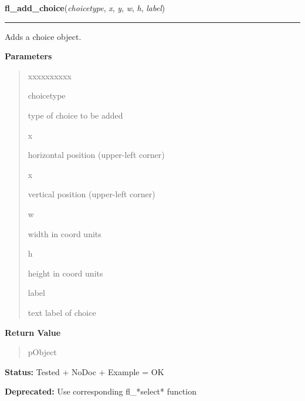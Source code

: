     \label{xformslib:deprecated:fl_add_choice}

    \vspace{0.5ex}

\hspace{.8\funcindent}\begin{boxedminipage}{\funcwidth}

    \raggedright \textbf{fl\_add\_choice}(\textit{choicetype}, \textit{x}, \textit{y}, \textit{w}, \textit{h}, \textit{label})

    \vspace{-1.5ex}

    \rule{\textwidth}{0.5\fboxrule}
\setlength{\parskip}{2ex}
    Adds a choice object.

\setlength{\parskip}{1ex}
      \textbf{Parameters}
      \vspace{-1ex}

      \begin{quote}
        \begin{Ventry}{xxxxxxxxxx}

          \item[choicetype]

          type of choice to be added

          \item[x]

          horizontal position (upper-left corner)

          \item[x]

          vertical position (upper-left corner)

          \item[w]

          width in coord units

          \item[h]

          height in coord units

          \item[label]

          text label of choice

        \end{Ventry}

      \end{quote}

      \textbf{Return Value}
    \vspace{-1ex}

      \begin{quote}
      pObject

      \end{quote}

\textbf{Status:} Tested + NoDoc + Example = OK



\textbf{Deprecated:} Use corresponding fl\_*select* function



    \end{boxedminipage}

